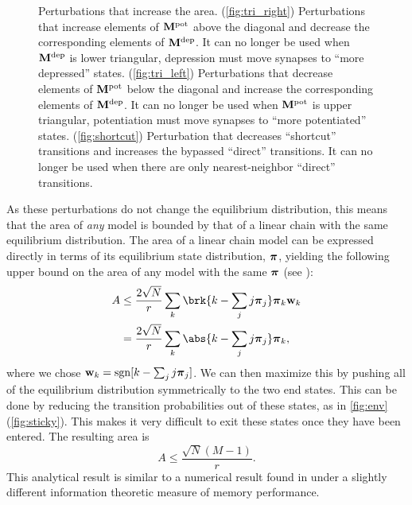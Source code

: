 \begin{figure}[tbp]
 \begin{center}
 \begin{myenuma}
  \label{fig:tri_right}\hp
  \label{fig:tri_left}\hp
  \label{fig:shortcut}
 \end{myenuma}
 \end{center}
  \caption[Perturbations that increase the area]{Perturbations that increase the area.
  (\ref{fig:tri_right}) Perturbations that increase elements of $\mathbf{M}^{\text{pot}}$ above the diagonal and decrease the corresponding elements of $\mathbf{M}^{\text{dep}}$. It can no longer be used when $\mathbf{M}^{\text{dep}}$ is lower triangular, \ie depression must move synapses to ``more depressed'' states.
  (\ref{fig:tri_left}) Perturbations that decrease elements of $\mathbf{M}^{\text{pot}}$ below the diagonal and increase the corresponding elements of $\mathbf{M}^{\text{dep}}$. It can no longer be used when $\mathbf{M}^{\text{pot}}$ is upper triangular, \ie potentiation must move synapses to ``more potentiated'' states.
  (\ref{fig:shortcut}) Perturbation that decreases ``shortcut'' transitions and increases the bypassed ``direct'' transitions. It can no longer be used when there are only nearest-neighbor ``direct'' transitions.
  \label{fig:perts}}
\end{figure}

As these perturbations do not change the equilibrium distribution, this means that the area of \emph{any} model is bounded by that of a linear chain with the same equilibrium distribution.
The area of a linear chain model can be expressed directly in terms of its equilibrium state distribution, $\boldsymbol{\pi}$, yielding the following upper bound on the area of any model with the same $\boldsymbol{\pi}$ (see \supp):
%
\begin{equation}\label{eq:multistatearea}
\begin{aligned}
  A &\leq \frac{2\sqrt{N}}{r} \sum_k \brk{k - \sum_j j\eq_j} \eq_k \w_k \\
    &= \frac{2\sqrt{N}}{r} \sum_k \abs{k - \sum_j j\eq_j} \eq_k ,
\end{aligned}
\end{equation}
%
where we chose $\mathbf{w}_k=\operatorname{sgn}[{k - \sum_j j\boldsymbol{\pi}_j}]$.
We can then maximize this by pushing all of the equilibrium distribution symmetrically to the two end states.
This can be done by reducing the transition probabilities out of these states, as in \cref{fig:env}(\ref{fig:sticky}). %
This makes it very difficult to exit these states once they have been entered.
The resulting area is
%
\begin{equation}\label{eq:max_area}
  A \leq \frac{\sqrt{N}(M-1)}{r}.
\end{equation}
%
This analytical result is similar to a numerical result found in \cite{Barrett2008discrete} under a slightly different information theoretic measure of memory performance.

